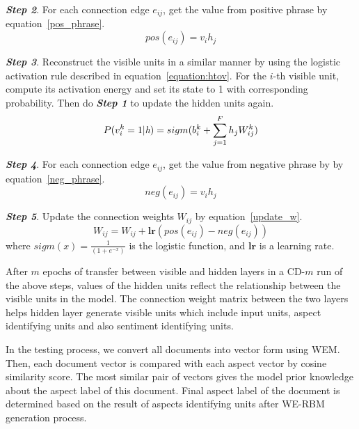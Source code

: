 \textbf{\emph{Step 2}}.
For each connection edge $e_{ij}$, get the value from positive phrase by equation~\ref{pos_phrase}.
\begin{equation} \label{pos_phrase}
pos(e_{ij}) = v_ih_j
\end{equation}

\textbf{\emph{Step 3}}.
Reconstruct the visible units in a similar manner by using the logistic activation rule described in equation~\ref{equation:htov}.
For the $i$-th visible unit, compute its activation energy and set its state to 1 with corresponding probability.
Then do \textbf{\emph{Step 1}} to update the hidden units again.
\begin{equation} \label{equation:htov}
P(v_i^k=1| \emph{h})=sigm(b_i^k+\sum^F_{j=1}h_jW^k_{ij})
\end{equation}

\textbf{\emph{Step 4}}.
For each connection edge $e_{ij}$, get the value from negative phrase by by equation~\ref{neg_phrase}.
\begin{equation} \label{neg_phrase}
neg(e_{ij}) = v_ih_j
\end{equation}

\textbf{\emph{Step 5}}.
Update the connection weights $W_{ij}$ by equation~\ref{update_w}.
\begin{equation} \label{update_w}
W_{ij} = W_{ij}+\textbf{lr}(pos(e_{ij}) - neg(e_{ij}))
\end{equation} 
where  $sigm(x) = \frac{1}{(1+e^{-x})}$ is the logistic function, and $\textbf{lr}$ is a learning rate. 

After $m$ epochs of transfer between visible and hidden layers in a CD-$m$ run of the above steps, values of the hidden units reflect the relationship between the visible units in the model.
The connection weight matrix between the two layers helps hidden layer generate visible units which include input units, aspect identifying units and also sentiment identifying units.

In the testing process, we convert all documents into vector form using WEM.
Then, each document vector is compared with each aspect vector by cosine similarity score.
The most similar pair of vectors gives the model prior knowledge about the aspect label of this document.
Final aspect label of the document is determined based on the result of aspects identifying units after WE-RBM generation process.